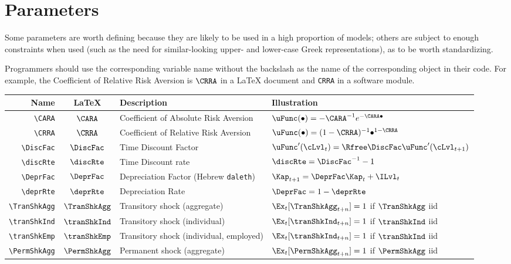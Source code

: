 \documentclass[12pt]{\econtex}
\begin{document}
\section{Parameters}
Some parameters are worth defining because they are likely to be
used in a high proportion of models; others are subject to enough
constraints when used (such as the need for similar-looking upper-
and lower-case Greek representations), as to be worth standardizing.

Programmers should
use the corresponding variable name without the backslash as the name of the corresponding object
in their code.  For example, the Coefficient of Relative Risk Aversion is $\verb|\CRRA|$ in a \LaTeX
document and \texttt{CRRA} in a software module.

\hypertarget{Parameters}{}
\begin{table}[ht]
  \centering
  \begin{tabular}{|>{\ttfamily}rcll|}
    \hline
    Name                   & \LaTeX         & Description & Illustration
    \\ \hline
    \verb|\CARA|           & $\CARA$       & Coefficient of Absolute Risk Aversion &$\uFunc(\bullet)=-\CARA^{-1} e^{-\CARA \bullet}$
    \\ \verb|\CRRA|        & $\CRRA$       & Coefficient of Relative Risk Aversion & $\uFunc(\bullet)=(1-\CRRA)^{-1}\bullet^{1-\CRRA}$
    \\ \verb|\DiscFac|     & $\DiscFac$    & Time Discount Factor & $\uFunc^{\prime}(\cLvl_{t}) =  \Rfree \DiscFac \uFunc^{\prime}(\cLvl_{t+1})$
    \\ \verb|\discRte|     & $\discRte$    & Time Discount rate & $\discRte=\DiscFac^{-1}-1$
    \\ \verb|\DeprFac|     & $\DeprFac$    & Depreciation Factor (Hebrew \texttt{daleth}) & $\Kap_{t+1} = \DeprFac \Kap_{t}+\ILvl_{t}$
    \\ \verb|\deprRte|     & $\deprRte$    & Depreciation Rate & $\DeprFac = 1-\deprRte$
    \\ \verb|\TranShkAgg|  & $\TranShkAgg$ & Transitory shock (aggregate) & $\Ex_{t}[\TranShkAgg_{t+n}]=1$ if $\TranShkAgg$ iid
    \\ \verb|\tranShkInd|  & $\tranShkInd$ & Transitory shock (individual) &  $\Ex_{t}[\tranShkInd_{t+n}]=1$ if $\tranShkInd$ iid
    \\ \verb|\tranShkEmp|  & $\tranShkEmp$ & Transitory shock (individual, employed) &  $\Ex_{t}[\tranShkInd_{t+n}]=1$ if $\tranShkInd$ iid
    \\ \verb|\PermShkAgg|  & $\PermShkAgg$ & Permanent shock (aggregate) & $\Ex_{t}[\PermShkAgg_{t+n}]=1$ if $\PermShkAgg$ iid

\end{tabular}
\end{table}
\end{document}
